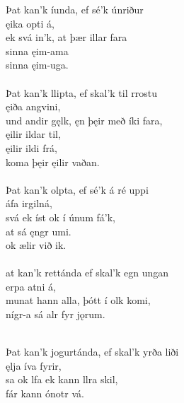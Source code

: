 \bva Þat kan'k íunda, \hld ef sé'k únriður \\%
\ind {}ęika opti á, \\%
ek svá in'k, \hld at þær illar fara \\%
\ind sinna ęim-ama \\%
\ind sinna ęim-uga.\\%

 \\

\bva Þat kan'k llipta, \hld ef skal'k til rrostu \\%
\ind {}ęiða angvini, \\%
und andir gęlk, \hld ęn þęir með íki fara, \\%
\ind {}ęilir ildar til, \\%
\ind {}ęilir ildi frá, \\%
\ind koma þęir ęilir vaðan.\\%

 \\

\bva Þat kan'k olpta, \hld ef sé'k á ré uppi \\%
\ind {}áfa irgilná, \\%
svá ek íst \hld ok í únum fá'k, \\%
\ind at sá ęngr umi. \\%
\ind ok ælir við ik.\\%

 \\

\bva {}at kan'k rettánda \hld ef skal'k egn ungan \\%
\ind {}erpa atni á,\footnotemark[49] \\%
munat hann alla, \hld þótt í olk komi, \\%
\ind {}nígr-a sá alr fyr jǫrum.\\%

 \\

\bva Þat kan'k jogurtánda, \hld ef skal'k yrða liði \\%
\ind {}ęlja íva fyrir, \\%
sa ok lfa \hld ek kann llra skil, \\%
\ind fár kann ónotr vá.\\%

